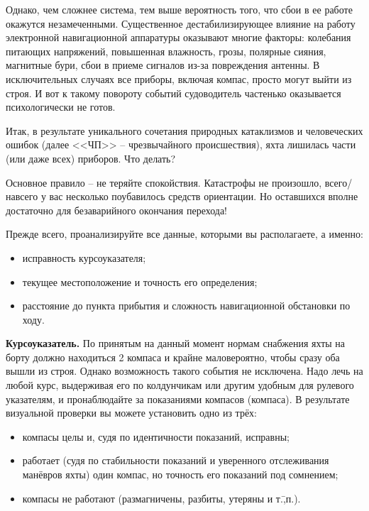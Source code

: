 \documentclass[a4paper, 12pt, twoside, final, book, russian, fittopage, cyremdash]{ncc}
\begin{document}
Однако, чем сложнее система, тем выше вероятность того, что сбои в ее работе окажутся незамеченными. Существенное дестабилизирующее влияние на работу электронной навигационной аппаратуры оказывают многие факторы: колебания питающих напряжений, повышенная влажность, грозы, полярные сияния, магнитные бури, сбои в приеме сигналов из-за повреждения антенны. В исключительных случаях все приборы, включая компас, просто могут выйти из строя. И вот к такому повороту событий судоводитель частенько оказывается психологически не готов. 

Итак, в результате уникального сочетания природных катаклизмов и человеческих ошибок (далее <<ЧП>> \--- чрезвычайного происшествия), яхта лишилась части (или даже всех) приборов. Что делать? 

Основное правило \--- не теряйте спокойствия. Катастрофы не произошло, всего\-/навсего у вас несколько поубавилось средств ориентации. Но оставшихся вполне достаточно для безаварийного окончания перехода!

Прежде всего, проанализируйте все данные, которыми вы располагаете, а именно: 

\begin{itemize}
\item исправность курсоуказателя; 
\item текущее местоположение и точность его определения; 
\item расстояние до пункта прибытия и сложность навигационной обстановки по ходу. 
\end{itemize}

\textbf{Курсоуказатель.} По принятым на данный момент нормам снабжения яхты на борту должно находиться 2 компаса и крайне маловероятно, чтобы сразу оба вышли из строя. Однако возможность такого события не исключена. Надо лечь на любой курс, выдерживая его по колдунчикам или другим удобным для рулевого указателям, и пронаблюдайте за показаниями компасов (компаса). В результате визуальной проверки вы можете установить одно из трёх: 

\begin{itemize}
\item компасы целы и, судя по идентичности показаний, исправны; 
\item работает (судя по стабильности показаний и уверенного отслеживания манёвров яхты) один компас, но точность его показаний под сомнением; 
\item компасы не работают (размагничены, разбиты, утеряны и т.\=,п.). 
\end{itemize}
\end{document}
